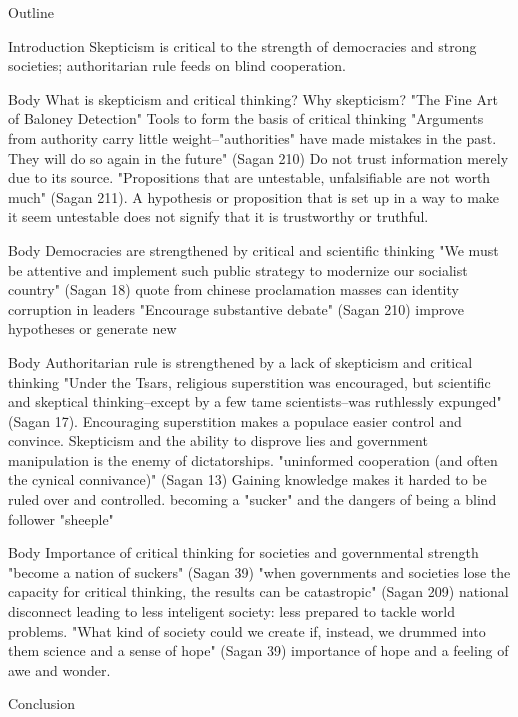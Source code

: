 \documentclass[12pt]{article}
\begin{document}
\begin{center}
Outline
\end{center}

\begin{outline}[enumerate]
    \1 Introduction
        \2 Skepticism is critical to the strength of democracies and strong societies; authoritarian rule feeds on blind cooperation.

    \1 Body
        \2 What is skepticism and critical thinking? Why skepticism?
            \3 "The Fine Art of Baloney Detection"
                \4 Tools to form the basis of critical thinking
            \3 "Arguments from authority carry little weight–"authorities" have made mistakes in the past.
                They will do so again in the future" (Sagan 210)
                \4 Do not trust information merely due to its source.
            \3 "Propositions that are untestable, unfalsifiable are not worth much" (Sagan 211).
                \4 A hypothesis or proposition that is set up in a way to make it seem untestable does not signify that
                it is trustworthy or truthful.

    \1 Body
        \2 Democracies are strengthened by critical and scientific thinking
            \3 "We must be attentive and implement such public strategy to modernize our socialist country" (Sagan 18)
                \4 quote from chinese proclamation
                \4 masses can identity corruption in leaders 
            \3 "Encourage substantive debate" (Sagan 210)
                \4 improve hypotheses or generate new

    \1 Body
        \2 Authoritarian rule is strengthened by a lack of skepticism and critical thinking 
            \3 "Under the Tsars, religious superstition was encouraged, but scientific and skeptical thinking–except by a few
                tame scientists–was ruthlessly expunged" (Sagan 17).
                \4 Encouraging superstition makes a populace easier control and convince.
                \4 Skepticism and the ability to disprove lies and government manipulation is the enemy of dictatorships.
            \3 "uninformed cooperation (and often the cynical connivance)" (Sagan 13)
                \4 Gaining knowledge makes it harded to be ruled over and controlled.
                \4 becoming a "sucker" and the dangers of being a blind follower "sheeple" 

    \1 Body
        \2 Importance of critical thinking for societies and governmental strength
            \3 "become a nation of suckers" (Sagan 39)
            \3 "when governments and societies lose the capacity for critical thinking, the results can be catastropic" (Sagan 209)
                \4 national disconnect leading to less inteligent society: less prepared to tackle world problems.
            \3 "What kind of society could we create if, instead, we drummed into them science and a sense of hope" (Sagan 39)
                \4 importance of hope and a feeling of awe and wonder.

    \1 Conclusion

\end{outline}
\end{document}
